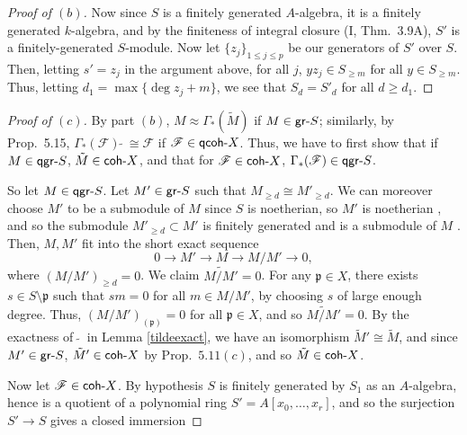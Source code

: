 \documentclass[10pt]{article}
\theoremstyle{definition}
\theoremstyle{remark}
\numberwithin{equation}{section}
\numberwithin{figure}{subsubsection}
\newcommand{\FF}{\mathscr{F}}
\newcommand{\gr}{\mathsf{gr}\mathchar`-}
\newcommand{\qgr}{\mathsf{qgr}\mathchar`-}
\newcommand{\qcoh}{\mathsf{qcoh}\mathchar`-}
\newcommand{\coh}{\mathsf{coh}\mathchar`-}
\begin{document}
\begin{proof}[Proof of $(b)$]
  \par Now since $S$ is a finitely generated $A$-algebra, it is a finitely generated $k$-algebra, and by the finiteness of integral closure (I, Thm.~3.9A), $S'$ is a finitely-generated $S$-module. Now let $\{z_j\}_{1 \le j \le p}$ be our generators of $S'$ over $S$. Then, letting $s' = z_j$ in the argument above, for all $j$, $yz_j \in S_{\ge m}$ for all $y \in S_{\ge m}$. Thus, letting $d_1 = \max\{\deg z_j + m\}$, we see that $S_d = S'_d$ for all $d \ge d_1$.
\end{proof}
\begin{proof}[Proof of $(c)$]
  By part $(b)$, $M \approx \Gamma_*(\tilde{M})$ if $M \in \gr S$; similarly, by Prop.~5.15, $\Gamma_*(\FF)\:\tilde{}\: \cong \FF$ if $\FF \in \qcoh X$. Thus, we have to first show that if $M \in \qgr S$, $\tilde{M} \in \coh X$, and that for $\FF \in \coh X$, $\Gamma_*(\FF) \in \qgr S$.
  \par So let $M \in \qgr S$. Let $M' \in \gr S$ such that $M_{\ge d} \cong M'_{\ge d}$. We can moreover choose $M'$ to be a submodule of $M$ since $S$ is noetherian, so $M'$ is noetherian \cite[Prop.~6.5]{AM69}, and so the submodule $M'_{\ge d} \subset M'$ is finitely generated and is a submodule of $M$ \cite[Prop.~6.2]{AM69}. Then, $M,M'$ fit into the short exact sequence
  \begin{equation*}
    0 \longrightarrow M' \longrightarrow M \longrightarrow M/M' \longrightarrow 0,
  \end{equation*}
  where $(M/M')_{\ge d} = 0$. We claim $\widetilde{M/M'} = 0$. For any $\mathfrak{p} \in X$, there exists $s \in S \setminus \mathfrak{p}$ such that $sm = 0$ for all $m \in M/M'$, by choosing $s$ of large enough degree. Thus, $(M/M')_{(\mathfrak{p})} = 0$ for all $\mathfrak{p} \in X$, and so $\widetilde{M/M'} = 0$. By the exactness of $\:\tilde{}\:$ in Lemma \ref{tildeexact}, we have an isomorphism $\tilde{M}' \cong \tilde{M}$, and since $M' \in \gr S$, $\tilde{M}' \in \coh X$ by Prop.~$5.11(c)$, and so $\tilde{M} \in \coh X$.
  \par Now let $\FF \in \coh X$. By hypothesis $S$ is finitely generated by
  $S_1$ as an $A$-algebra, hence is a quotient of a polynomial ring $S' =
  A[x_0,\ldots,x_r]$, and so the surjection $S' \to S$ gives a closed immersion

\end{proof}
\end{document}
